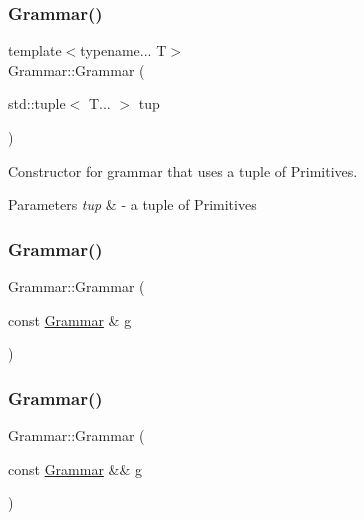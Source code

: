 \mbox{\label{class_grammar_a4e0a3b86d64eba75726b7355308c4649}} 
\subsubsection{\texorpdfstring{Grammar()}{Grammar()}\hspace{0.1cm}{\footnotesize\ttfamily [2/4]}}
{\footnotesize\ttfamily template$<$typename... T$>$ \\
Grammar\+::\+Grammar (\begin{DoxyParamCaption}\item[{std\+::tuple$<$ T... $>$}]{tup }\end{DoxyParamCaption})\hspace{0.3cm}{\ttfamily [inline]}}

Constructor for grammar that uses a tuple of Primitives. 
\begin{DoxyParams}{Parameters}
{\em tup} & -\/ a tuple of Primitives\\
\hline
\end{DoxyParams}
\mbox{\label{class_grammar_acfb7e4ea64210d03de896e300447e760}} 
\subsubsection{\texorpdfstring{Grammar()}{Grammar()}\hspace{0.1cm}{\footnotesize\ttfamily [3/4]}}
{\footnotesize\ttfamily Grammar\+::\+Grammar (\begin{DoxyParamCaption}\item[{const \hyperlink{class_grammar}{Grammar} \&}]{g }\end{DoxyParamCaption})\hspace{0.3cm}{\ttfamily [delete]}}

\mbox{\label{class_grammar_a28f97335602afe8b1a612679de2f80d9}} 
\subsubsection{\texorpdfstring{Grammar()}{Grammar()}\hspace{0.1cm}{\footnotesize\ttfamily [4/4]}}
{\footnotesize\ttfamily Grammar\+::\+Grammar (\begin{DoxyParamCaption}\item[{const \hyperlink{class_grammar}{Grammar} \&\&}]{g }\end{DoxyParamCaption})\hspace{0.3cm}{\ttfamily [delete]}}



